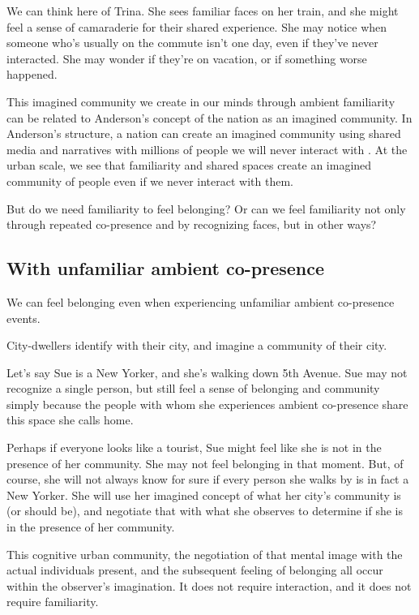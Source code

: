 \documentclass[12pt]{article}
\begin{document}
We can think here of Trina. She sees familiar faces on her train, and she might feel a sense of camaraderie for their shared experience. She may notice when someone who's usually on the commute isn't one day, even if they've never interacted. She may wonder if they're on vacation, or if something worse happened. 

This imagined community we create in our minds through ambient familiarity can be related to Anderson's concept of the nation as an imagined community. In Anderson's structure, a nation can create an imagined community using shared media and narratives with millions of people we will never interact with \citep{anderson2006}. At the urban scale, we see that familiarity and shared spaces create an imagined community of people even if we never interact with them. 

But do we need familiarity to feel belonging? Or can we feel familiarity not only through repeated co-presence and by recognizing faces, but in other ways?

\subsection{With unfamiliar ambient co-presence}

We can feel belonging even when experiencing unfamiliar ambient co-presence events.

City-dwellers identify with their city, and imagine a community of their city. 

Let's say Sue is a New Yorker, and she's walking down 5th Avenue. Sue may not recognize a single person, but still feel a sense of belonging and community simply because the people with whom she experiences ambient co-presence share this space she calls home. 

Perhaps if everyone looks like a tourist, Sue might feel like she is not in the presence of her community. She may not feel belonging in that moment. But, of course, she will not always know for sure if every person she walks by is in fact a New Yorker. She will use her imagined concept of what her city's community is (or should be), and negotiate that with what she observes to determine if she is in the presence of her community. 

This cognitive urban community, the negotiation of that mental image with the actual individuals present, and the subsequent feeling of belonging all occur within the observer's imagination. It does not require interaction, and it does not require familiarity.
\end{document}
